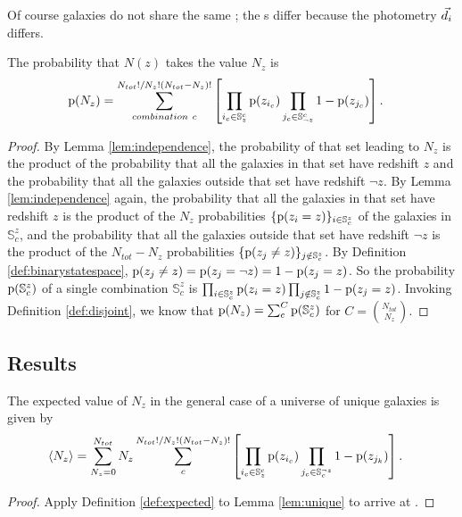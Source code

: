 Of course galaxies do not share the same \pzpdf; the \pzpdf s differ because the photometry $\vec{d}_{i}$ differs.
\begin{lemma}\label{lem:unique}
	The probability that $N(z)$ takes the value $N_{z}$ is 
	\begin{align}
	\eqlabel{eqn:general}
	\pr{N_{z}} &= \sum_{combination\ c}^{N_{tot}! / N_{z}! (N_{tot} - N_{z})!} \left[ \prod_{i_{c} \in \mathbb{S}_{z}^{c}} \pr{z_{i_{c}}} \prod_{j_{c} \in \mathbb{S}_{\lnot z}^{c}} 1 - \pr{z_{j_{c}}} \right] .
	\end{align}
\end{lemma}
\begin{proof}
	By Lemma \ref{lem:independence}, the probability of that set leading to $N_{z}$ is the product of the probability that all the galaxies in that set have redshift $z$ and the probability that all the galaxies outside that set have redshift $\lnot z$.
	By Lemma \ref{lem:independence} again, the probability that all the galaxies in that set have redshift $z$ is the product of the $N_{z}$ probabilities $\{\mathrm{p}(z_{i} = z)\}_{i \in \mathbb{S}^{z}_{c}}$ of the galaxies in $\mathbb{S}^{z}_{c}$, and the probability that all the galaxies outside that set have redshift $\lnot z$ is the product of the $N_{tot} - N_{z}$ probabilities $\{\mathrm{p}(z_{j} \neq z)\}_{j \notin \mathbb{S}^{z}_{c}}$.
	By Definition \ref{def:binarystatespace}, $\mathrm{p}(z_{j} \neq z) = \mathrm{p}(z_{j} = \lnot z) = 1 - \mathrm{p}(z_{j} = z)$.
	So the probability $\mathrm{p}(\mathbb{S}^{z}_{c})$ of a single combination $\mathbb{S}^{z}_{c}$ is $\prod_{i \in \mathbb{S}^{z}_{c}} \mathrm{p}(z_{i} = z) \prod_{j \notin \mathbb{S}^{z}_{c}} 1 - \mathrm{p}(z_{j} = z)$.
	Invoking Definition \ref{def:disjoint}, we know that $\mathrm{p}(N_{z}) = \sum_{c}^{C} \mathrm{p}(\mathbb{S}^{z}_{c})$ for $C = \binom{N_{tot}}{N_{z}}$.
\end{proof}

\subsection{Results}

\begin{theorem}\label{thm:general}
	The expected value of $N_{z}$ in the general case of a universe of unique galaxies is given by
	\begin{align}
	\eqlabel{eqn:complete}
	\langle N_{z} \rangle &= \sum_{N_{z} = 0}^{N_{tot}} N_{z} \sum_{c}^{N_{tot}! / N_{z}! (N_{tot} - N_{z})!} \left[ \prod_{i_{c} \in \mathbb{S}^{c}_{z}} \pr{z_{i_{c}}} \prod_{j_{c} \in \mathbb{S}_{c}^{\lnot z}} 1 - \pr{z_{j_{k}}} \right].
	\end{align}
\end{theorem}
\begin{proof}
	Apply Definition \ref{def:expected} to Lemma \ref{lem:unique} to arrive at .
\end{proof}

